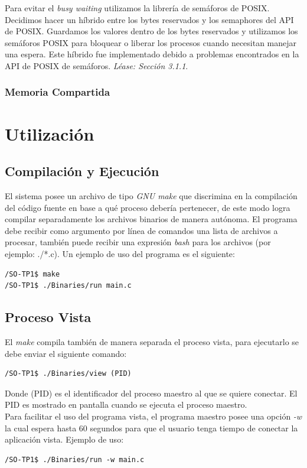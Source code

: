 \documentclass[10pt,a4paper]{report}
\begin{document}
Para evitar el \textit{busy waiting} utilizamos la librería de semáforos de POSIX. Decidimos hacer un híbrido entre los bytes reservados y los semaphores del API de POSIX. Guardamos los valores dentro de los bytes reservados y utilizamos los semáforos POSIX para bloquear o liberar los procesos cuando necesitan manejar una espera. Este híbrido fue implementado debido a problemas encontrados en la API de POSIX de semáforos. \textit{Léase: Sección 3.1.1}.
\subsection{Memoria Compartida}

\chapter{Utilización}
\section{Compilación y Ejecución}
El sistema posee un archivo de tipo \textit{GNU make} que discrimina en la compilación del código fuente en base a qué proceso debería pertenecer, de este modo logra compilar separadamente los archivos binarios de manera autónoma. El programa debe recibir como argumento por línea de comandos una lista de archivos a procesar, también puede recibir una expresión \textit{bash} para los archivos (por ejemplo: ./*.c). Un ejemplo de uso del programa es el siguiente:
\begin{lstlisting}
/SO-TP1$ make
/SO-TP1$ ./Binaries/run main.c
\end{lstlisting}


\section{Proceso Vista}
El \textit{make} compila también de manera separada el proceso vista, para ejecutarlo se debe enviar el siguiente comando:
\begin{lstlisting}
/SO-TP1$ ./Binaries/view (PID)
\end{lstlisting}
Donde (PID) es el identificador del proceso maestro al que se quiere conectar. El PID es mostrado en pantalla cuando se ejecuta el proceso maestro. \\
\indent Para facilitar el uso del programa vista, el programa maestro posee una opción \textit{-w} la cual espera hasta 60 segundos para que el usuario tenga tiempo de conectar la aplicación vista. Ejemplo de uso:
\begin{lstlisting}
/SO-TP1$ ./Binaries/run -w main.c 
\end{lstlisting}
\end{document}
